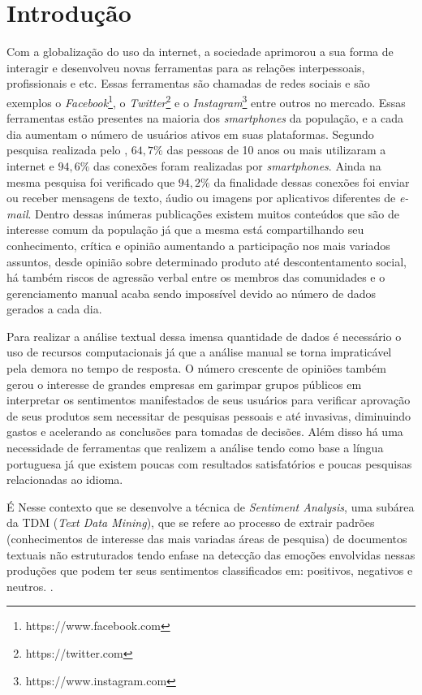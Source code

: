 \chapter{Introdução}
\label{cap:Introducao}
Com a globalização do uso da internet, a sociedade aprimorou a sua forma de interagir e desenvolveu novas ferramentas para as relações interpessoais, profissionais e etc. Essas ferramentas são chamadas de redes sociais e são exemplos o \textit{Facebook}\footnote{https://www.facebook.com}, o \textit{Twitter}\footnote{https://twitter.com} e o \textit{Instagram}\footnote{https://www.instagram.com} entre outros no mercado. Essas ferramentas estão presentes na maioria dos \textit{smartphones} da população, e a cada dia aumentam o número de usuários ativos em suas plataformas. Segundo pesquisa realizada pelo , $64,7\%$ das pessoas de 10 anos ou mais utilizaram a internet e $94,6\%$ das conexões foram realizadas por \textit{smartphones}. Ainda na mesma pesquisa foi verificado que $94,2\%$ da finalidade dessas conexões foi enviar ou receber mensagens de texto, áudio ou imagens por aplicativos diferentes de \textit{e-mail}. Dentro dessas inúmeras publicações existem muitos conteúdos que são de interesse comum da população já que a mesma está compartilhando seu conhecimento, crítica e opinião aumentando a participação nos mais variados assuntos, desde opinião sobre determinado produto até descontentamento social, há também riscos de agressão verbal entre os membros das comunidades e o gerenciamento manual acaba sendo impossível devido ao número de dados gerados a cada dia.

Para realizar a análise textual dessa imensa quantidade de dados é necessário o uso de recursos computacionais já que a análise manual se torna impraticável  pela demora no tempo de resposta. O número crescente de opiniões também gerou o interesse de grandes empresas em garimpar grupos públicos em interpretar os sentimentos manifestados de seus usuários para verificar aprovação de seus produtos sem necessitar de pesquisas pessoais e até invasivas, diminuindo gastos e acelerando as conclusões para tomadas de decisões. Além disso há uma necessidade de ferramentas que realizem a análise tendo como base a língua portuguesa já que existem poucas com resultados satisfatórios e poucas pesquisas relacionadas ao idioma.

É Nesse contexto que se desenvolve a técnica de \textit{Sentiment Analysis}, uma subárea da TDM (\textit{Text Data Mining})\cite{Hearst:1999:UTD:1034678.1034679}, que se refere ao processo de extrair padrões (conhecimentos de interesse das mais variadas áreas de pesquisa) de documentos textuais não estruturados tendo enfase na detecção das emoções envolvidas nessas produções que podem ter seus sentimentos classificados em: positivos, negativos e neutros. \cite{Li:2010:SAG:2898607.2898826}. 

